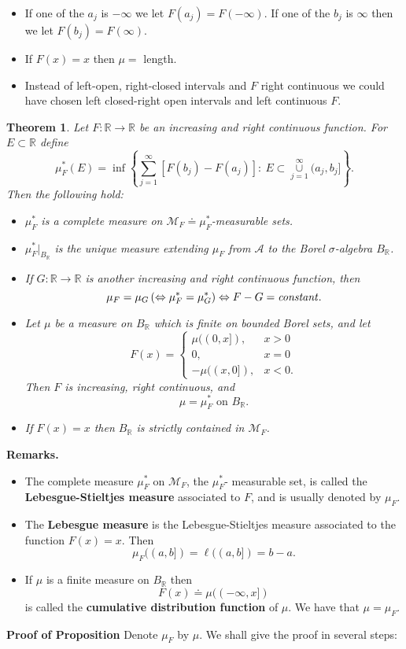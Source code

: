 \documentclass[12pt]{report}
\newtheorem{theorem}{Theorem}[section]
\begin{document}
\medskip
{}\begin{itemize}
\item[1.] If one of the $a_j$ is $- \infty$ we let $F(a_j) = F(- \infty)$.  If one
of the $b_j$ is $\infty$ then we let $F (b_j) = F(\infty)$.
\item[2.]  If $F(x) = x$ then $\mu =$ length.
\item[3.]  Instead of left-open, right-closed intervals and $F$ right
continuous we could have chosen left closed-right open intervals and left
continuous $F$.
\end{itemize}


\begin{theorem}  Let $F: \mathbb{R} \longrightarrow
\mathbb{R}$ be an increasing and right continuous function.  For  $E
\subset \mathbb{R} $ define
\[
\mu^*_F (E) = \inf \left\{ \sum^\infty_{j=1} [F(b_j) - F(a_j)]: \ E \subset
\overset{\infty}{\underset{j=1}{\cup}} (a_j, b_j] \right \}.
\]
Then the following hold:
\begin{itemize}
\item[(a)]  $\mu^*_F$   is a complete measure on $\mathcal{M}_F
\doteq
\mu^*_F$-measurable sets.
\item[(b)]  $\mu^*_F |_{B_{\mathbb{R}}}$   is the unique measure
extending
$\mu_F$ from $\mathcal{A}$ to the Borel $\sigma$-algebra
$B_\mathbb{R}$.
\item[(c)]    If $G: \mathbb{R} \longrightarrow \mathbb{R}$ is
another increasing and right continuous function, then
\[\mu_F = \mu_G \left ( \Leftrightarrow \mu^*_F = \mu^*_G \right )
\Leftrightarrow F - G =\mbox{\textit{constant}}.
\]
\item[d)]    Let $\mu$ be a measure on $B_{\mathbb{R}}$ which is
finite on bounded Borel sets, and let
\[
 F(x) = \left \{ \begin{array}{ll}
\mu((0, x]), &x > 0\\ 0, &x = 0\\ - \mu((x, 0]), &x < 0. \end{array} \right .
\]
 Then $F$ is increasing, right continuous, and
\[
\mu = \mu^*_F \mbox{ on } B_{\mathbb{R}}.
\]
\item[e)]   If $F(x) = x$ then $B_{\mathbb{R}}$ is strictly
contained in $\mathcal{M}_F$.
\end{itemize}
\end{theorem}
{\bf  Remarks.}
\begin{itemize}
\item[1)]  The complete measure $\mu^*_F$ on $\mathcal{M}_F$, the
$\mu^*_F $- measurable set, is called the {\bf  Lebesgue-Stieltjes
measure} associated to $F$, and is usually denoted by $\mu_F.$
\item[2)]  The {\bf  Lebesgue measure} is the Lebesgue-Stieltjes
measure associated to the function $F(x) = x$.  Then
\[\mu_F((a, b]) = \ell((a, b]) = b -a.
\]
\item[3)]  If $\mu$ is a finite measure on $B_{\mathbb{R}}$ then
\[F(x) \doteq \mu((- \infty, x])
\] is called the {\bf  cumulative distribution function} of $\mu$.  We
have that
$\mu = \mu_F$.
\end{itemize}
{\bf Proof of Proposition} 
 Denote $\mu_F$ by $\mu$.  We shall give
the proof in several steps:
\end{document}
